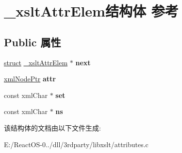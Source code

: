 \hypertarget{struct__xslt_attr_elem}{}\section{\+\_\+xslt\+Attr\+Elem结构体 参考}
\label{struct__xslt_attr_elem}
\subsection*{Public 属性}
\begin{DoxyCompactItemize}
\item 
\mbox{\label{struct__xslt_attr_elem_a2fc386ecc1d7081c4832500148c213d8}} 
\hyperlink{interfacestruct}{struct} \hyperlink{struct__xslt_attr_elem}{\+\_\+xslt\+Attr\+Elem} $\ast$ {\bfseries next}
\item 
\mbox{\label{struct__xslt_attr_elem_a7a72e87b12bae5f8d95edc005d6a0abc}} 
\hyperlink{struct__xml_node}{xml\+Node\+Ptr} {\bfseries attr}
\item 
\mbox{\label{struct__xslt_attr_elem_a1db78f786bffe723098f0d558ffc57c5}} 
const xml\+Char $\ast$ {\bfseries set}
\item 
\mbox{\label{struct__xslt_attr_elem_aa9311ae2788bb6ba960a2536e09cab84}} 
const xml\+Char $\ast$ {\bfseries ns}
\end{DoxyCompactItemize}


该结构体的文档由以下文件生成\+:\begin{DoxyCompactItemize}
\item 
E\+:/\+React\+O\+S-\/0../dll/3rdparty/libxslt/attributes.\+c\end{DoxyCompactItemize}
